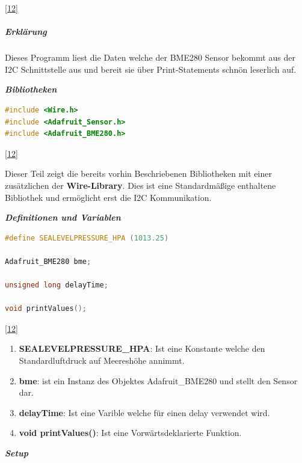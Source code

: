 \documentclass[
    headings=optiontotocandhead,%
    twoside,
    numbers=noenddot,%
    12pt, %
    titlepage, %
    parskip=full, %
    listof=leveldown, 
    numbers=noenddot, %
    a4paper,DIV=14,
    BCOR=15mm,
]{scrbook}
\providecommand{\tightlist}{%
  \setlength{\itemsep}{0pt}\setlength{\parskip}{0pt}}
\begin{document}
{[}\protect\hyperlink{ref-BME280-Test}{12}{]}

\hypertarget{erkluxe4rung}{%
\subparagraph{Erklärung}\label{erkluxe4rung}}

Dieses Programm liest die Daten welche der BME280 Sensor bekommt aus der
I2C Schnittstelle aus und bereit sie über Print-Statements schnön
leserlich auf.

\textbf{\emph{Bibliotheken}}

\begin{lstlisting}[language={C++}, caption={Dependencies BME}]
#include <Wire.h>
#include <Adafruit_Sensor.h>
#include <Adafruit_BME280.h>
\end{lstlisting}

{[}\protect\hyperlink{ref-BME280-Test}{12}{]}

Dieser Teil zeigt die bereits vorhin Beschriebenen Bibliotheken mit
einer zusätzlichen der \textbf{Wire-Library}. Dies ist eine
Standardmäßige enthaltene Bibliothek und ermöglicht erst die I2C
Kommunikation.

\textbf{\emph{Definitionen und Variablen}}

\begin{lstlisting}[language={C++}, caption={Definition und Variablen BME}]
#define SEALEVELPRESSURE_HPA (1013.25)

Adafruit_BME280 bme; 

unsigned long delayTime;

void printValues();
\end{lstlisting}

{[}\protect\hyperlink{ref-BME280-Test}{12}{]}

\begin{enumerate}
\def\labelenumi{\arabic{enumi}.}
\tightlist
\item
  \textbf{SEALEVELPRESSURE\_HPA}: Ist eine Konstante welche den
  Standardluftdruck auf Meereshöhe annimmt.
\item
  \textbf{bme}: ist ein Instanz des Objektes Adafruit\_BME280 und stellt
  den Sensor dar.
\item
  \textbf{delayTime}: Ist eine Varible welche für einen delay verwendet
  wird.
\item
  \textbf{void printValues()}: Ist eine Vorwärtsdeklarierte Funktion.
\end{enumerate}

\textbf{\emph{Setup}}
\end{document}
